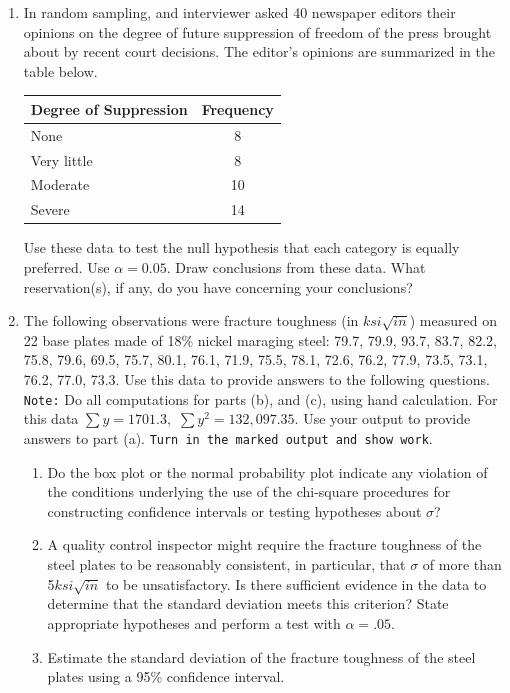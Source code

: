 \documentclass[11pt]{article}
\begin{document}
\begin{enumerate}
\item In random sampling, and interviewer asked 40 newspaper editors their opinions on the degree of future suppression of freedom of the press brought about by recent court decisions. The editor's opinions are summarized in the table below. 
\begin{center}
\begin{tabular}{|l|c|} \hline
Degree of Suppression & Frequency \\ \hline
None & 8\\ \hline
Very little & 8\\ \hline
Moderate & 10\\ \hline
Severe & 14\\ \hline
\end{tabular}
\end{center}
Use these data to test the null hypothesis that each category is equally preferred. Use $\alpha=0.05$. Draw conclusions from these data. What reservation(s), if any, do you have concerning your conclusions? 
\newpage
\item The following observations were fracture toughness (in $ksi\sqrt{in}$) measured on 22 base plates made of 18\% nickel maraging steel: 79.7, 79.9, 93.7, 83.7, 82.2, 75.8, 79.6, 69.5, 75.7, 80.1, 76.1, 71.9, 75.5, 78.1, 72.6, 76.2, 77.9, 73.5, 73.1, 76.2, 77.0, 73.3. Use this 
data to provide answers to the following questions.\\[.1in]
\texttt{Note:} Do all computations for parts (b), and (c), using 
hand calculation. For this data $\sum{y}=1701.3,$ $\sum{y^2}=132,097.35$. Use your output to provide answers to part (a).
 \texttt{Turn in the marked output and show work}. 
\begin{enumerate}
\item  Do the box plot or the normal probability plot indicate any violation of the conditions
underlying the use of the chi-square procedures for constructing
confidence intervals or testing hypotheses about $\sigma$?

\item A quality control inspector might require the fracture toughness of the steel plates  
to be reasonably consistent, in particular, that $\sigma$ of more than 5$ksi\sqrt{in}$ to be unsatisfactory. Is there sufficient evidence in the data to determine that the standard deviation meets this criterion? State appropriate hypotheses and perform a test with $\alpha=.05$.

\item Estimate the standard deviation of the  fracture toughness of the steel plates 
 using a 95\% confidence interval.
\end{enumerate}


\end{enumerate}
\end{document}
